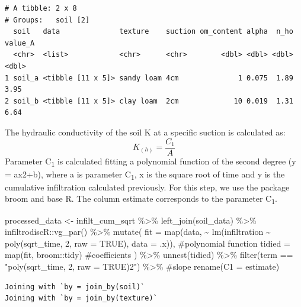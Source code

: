 \documentclass[
]{article}
\newenvironment{Shaded}{\begin{snugshade}}{\end{snugshade}}
\newcommand{\AttributeTok}[1]{\textcolor[rgb]{0.40,0.45,0.13}{#1}}
\newcommand{\CommentTok}[1]{\textcolor[rgb]{0.37,0.37,0.37}{#1}}
\newcommand{\ConstantTok}[1]{\textcolor[rgb]{0.56,0.35,0.01}{#1}}
\newcommand{\DecValTok}[1]{\textcolor[rgb]{0.68,0.00,0.00}{#1}}
\newcommand{\FunctionTok}[1]{\textcolor[rgb]{0.28,0.35,0.67}{#1}}
\newcommand{\NormalTok}[1]{\textcolor[rgb]{0.00,0.23,0.31}{#1}}
\newcommand{\OtherTok}[1]{\textcolor[rgb]{0.00,0.23,0.31}{#1}}
\newcommand{\SpecialCharTok}[1]{\textcolor[rgb]{0.37,0.37,0.37}{#1}}
\newcommand{\StringTok}[1]{\textcolor[rgb]{0.13,0.47,0.30}{#1}}
\begin{document}
\begin{verbatim}
# A tibble: 2 x 8
# Groups:   soil [2]
  soil   data              texture    suction om_content alpha  n_ho value_A
  <chr>  <list>            <chr>      <chr>        <dbl> <dbl> <dbl>   <dbl>
1 soil_a <tibble [11 x 5]> sandy loam 4cm              1 0.075  1.89    3.95
2 soil_b <tibble [11 x 5]> clay loam  2cm             10 0.019  1.31    6.64
\end{verbatim}

The hydraulic conductivity of the soil K at a specific suction is
calculated as: \[K_{(h)} = \frac{C_{1}}{A}\] Parameter
C\textsubscript{1} is calculated fitting a polynomial function of the
second degree (y = ax2+b), where a is parameter C\textsubscript{1}, x is
the square root of time and y is the cumulative infiltration calculated
previously. For this step, we use the package broom and base R. The
column estimate corresponds to the parameter C\textsubscript{1}.

\begin{Shaded}
\begin{Highlighting}[]
\NormalTok{processed\_data }\OtherTok{\textless{}{-}} 
\NormalTok{infilt\_cum\_sqrt }\SpecialCharTok{\%\textgreater{}\%} 
  \FunctionTok{left\_join}\NormalTok{(soil\_data) }\SpecialCharTok{\%\textgreater{}\%} 
\NormalTok{  infiltrodiscR}\SpecialCharTok{::}\FunctionTok{vg\_par}\NormalTok{() }\SpecialCharTok{\%\textgreater{}\%} 
    \FunctionTok{mutate}\NormalTok{(}
    \AttributeTok{fit =} \FunctionTok{map}\NormalTok{(data,}
              \SpecialCharTok{\textasciitilde{}} \FunctionTok{lm}\NormalTok{(infiltration }\SpecialCharTok{\textasciitilde{}} \FunctionTok{poly}\NormalTok{(sqrt\_time, }\DecValTok{2}\NormalTok{, }\AttributeTok{raw =} \ConstantTok{TRUE}\NormalTok{),}
                   \AttributeTok{data =}\NormalTok{ .x)), }\CommentTok{\#polynomial function}
    \AttributeTok{tidied =} \FunctionTok{map}\NormalTok{(fit, broom}\SpecialCharTok{::}\NormalTok{tidy) }\CommentTok{\#coefficients}
\NormalTok{  ) }\SpecialCharTok{\%\textgreater{}\%} 
  \FunctionTok{unnest}\NormalTok{(tidied) }\SpecialCharTok{\%\textgreater{}\%} 
\FunctionTok{filter}\NormalTok{(term }\SpecialCharTok{==} \StringTok{"poly(sqrt\_time, 2, raw = TRUE)2"}\NormalTok{) }\SpecialCharTok{\%\textgreater{}\%} \CommentTok{\#slope}
\FunctionTok{rename}\NormalTok{(}\AttributeTok{C1 =}\NormalTok{ estimate) }
\end{Highlighting}
\end{Shaded}

\begin{verbatim}
Joining with `by = join_by(soil)`
Joining with `by = join_by(texture)`
\end{verbatim}
\end{document}
